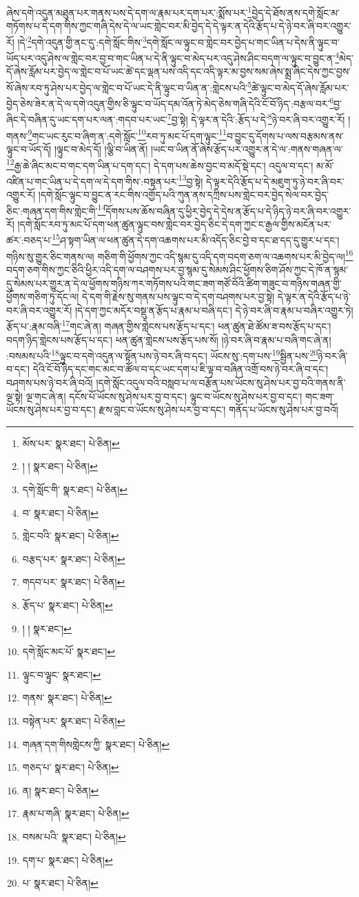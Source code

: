 ཞེས་དགེ་འདུན་མཐུན་པར་གནས་པས་དེ་དག་ལ་རྣམ་པར་དག་པར་:སྨོས་པར་\footnote{མོས་པར་  སྣར་ཐང་།  པེ་ཅིན། }བྱེད་དེ་ཐོས་ནས་དགེ་སློང་མ་གཏོགས་པ་དེ་དག་གིས་ཀྱང་གཞི་དེས་དེ་ལ་ཡང་གླེང་བར་མི་བྱེད་དེ་དེ་ལྟར་ན་དེའི་རྩོད་པ་དེ་ཉེ་བར་ཞི་བར་འགྱུར་རོ། །དེ་\footnote{། །  སྣར་ཐང་།  པེ་ཅིན། }དགེ་འདུན་གྱི་ནང་དུ་:དགེ་སློང་གིས་\footnote{དགེ་སློང་གི་  སྣར་ཐང་།  པེ་ཅིན། }དགེ་སློང་ལ་ལྟུང་བ་གླེང་བར་བྱེད་པ་གང་ཡིན་པ་དེས་ནི་ལྟུང་བ་ཡོད་པར་འདུ་ཤེས་ལ་གླེང་བར་བྱ་བ་གང་ཡིན་པ་དེ་ནི་ལྟུང་བ་མེད་པར་འདུ་ཤེས་ཤིང་བདག་ལ་ལྟུང་བ་བྱུང་ན་\footnote{བ་  སྣར་ཐང་།  པེ་ཅིན། }མེད་དོ་ཞེས་རློམ་པར་བྱེད་ལ་གླེང་བ་པོ་ཡང་ཚེ་དང་ལྡན་པས་འདི་དང་འདི་ལྟར་མ་བྱས་སམ་ཞེས་སྨྲ་ཞིང་དེས་ཀྱང་བྱས་སོ་ཞེས་རབ་ཏུ་ཤེས་པར་བྱེད་ལ་གླེང་བ་པོ་ཡང་དེ་ནི་ལྟུང་བ་ཡིན་ན་:གླེངས་པའི་\footnote{གླེང་བའི་  སྣར་ཐང་།  པེ་ཅིན། }ཚེ་ལྟུང་བ་མེད་དོ་ཞེས་རློམ་པར་བྱེད་ཅེས་ཟེར་ན་དེ་ལ་དགེ་འདུན་གྱིས་ཅི་ལྟུང་བ་ཡོད་དམ་འོན་ཏེ་མེད་ཅེས་གཞི་དེའི་ངོ་བོ་ཉིད་:བརྩལ་བར་\footnote{བརྩད་པར་  སྣར་ཐང་།  པེ་ཅིན། }བྱ་ཞིང་དེ་བཞིན་དུ་ཡང་དག་པར་ལན་:གདབ་པར་ཡང་\footnote{གདབ་པར་  སྣར་ཐང་།  པེ་ཅིན། }བྱ་སྟེ། དེ་ལྟར་ན་དེའི་:རྩོད་པ་དེ་\footnote{རྩོད་པ་  སྣར་ཐང་།  པེ་ཅིན། }ཉེ་བར་ཞི་བར་འགྱུར་རོ། །གནས་\footnote{། །  སྣར་ཐང་། }གང་ཡང་རུང་བ་ཞིག་ན་:དགེ་སློང་\footnote{དགེ་སློང་མང་པོ་  སྣར་ཐང་། }རབ་ཏུ་མང་པོ་དག་ལྟུང་\footnote{ལྟུང་བ་ལྟུང་  སྣར་ཐང་། }བ་བྱུང་དུ་དོགས་པ་ལས་བརྩམས་ནས་ལྟུང་བ་ཡོད་དོ། །ལྟུང་བ་མེད་དོ། །ལྕི་བ་ཡིན་ནོ། །ཡང་བ་ཡིན་ནོ་ཞེས་རྩོད་པར་འགྱུར་ན་དེ་ལ་:གནས་གཞན་ལ་\footnote{གནས་  སྣར་ཐང་།  པེ་ཅིན། }རྒྱ་ཆེ་ཞིང་མང་བ་གང་དག་ཡིན་པ་དག་དང་། དེ་དག་པས་ཆེས་བྱང་བ་མདོ་སྡེ་དང་། འདུལ་བ་དང་། མ་མོ་འཛིན་པ་གང་ཡིན་པ་དེ་དག་ལ་དེ་དག་གིས་:བསྟན་པར་\footnote{བསྟེན་པར་  སྣར་ཐང་།  པེ་ཅིན། }བྱ་སྟེ། དེ་ལྟར་དེའི་རྩོད་པ་དེ་མཇུག་ཏུ་ཉེ་བར་ཞི་བར་འགྱུར་རོ། །དགེ་སློང་ལྟུང་བ་བྱུང་ན་རང་གིས་འགྱོད་པའི་ཀུན་ནས་དཀྲིས་པས་གླེང་བར་བྱེད་སེལ་བར་བྱེད་ཅིང་:གཞན་དག་གིས་གླེང་གི་\footnote{གཞན་དག་གིསགླེངས་ཀྱི་  སྣར་ཐང་།  པེ་ཅིན། }དོགས་པས་ཆོས་བཞིན་དུ་ཕྱིར་བྱེད་དེ་དེས་ན་རྩོད་པ་དེ་ཉིད་ཉེ་བར་ཞི་བར་འགྱུར་རོ། །དགེ་སློང་རབ་ཏུ་མང་པོ་དག་ཕན་ཚུན་ལྟུང་བས་གླེང་བར་བྱེད་ཅིང་དེ་དག་ཀྱང་ང་རྒྱལ་གྱིས་མངོན་པར་ཚར་:བཅད་པ་\footnote{གཅད་པ་  སྣར་ཐང་།  པེ་ཅིན། }ཤ་སྟག་ཡིན་ལ་ཕན་ཚུན་དེ་དག་འཆགས་པར་མི་འདོད་ཅིང་བྱེ་བ་དང་ཐ་དད་དུ་གྱུར་པ་དང་། གཉིས་སུ་གྱུར་ཅིང་གནས་ལ། གཅིག་གི་ཕྱོགས་ཀྱང་འདི་སྙམ་དུ་འདི་དག་བདག་ཅག་ལ་འཆགས་པར་མི་བྱེད་ལ།\footnote{ན།  སྣར་ཐང་།  པེ་ཅིན། } བདག་ཅག་གིས་ཀྱང་ཅིའི་ཕྱིར་འདི་དག་ལ་བཤགས་པར་བྱ་སྙམ་དུ་སེམས་ཤིང་ཕྱོགས་ཅིག་ཤོས་ཀྱང་དེ་ཁོ་ན་སྙམ་དུ་སེམས་པར་གྱུར་ན་དེ་ལ་ཕྱོགས་གཉིས་ཀར་གཏོགས་པའི་གང་ཟག་གཙོ་བོའི་ཚིག་གཟུང་བ་གཉིས་གཞན་གྱི་ཕྱོགས་གཅིག་ཏུ་དོང་ལ། དེ་དག་གི་རྗེས་སུ་གནས་པས་ལྟུང་བ་དེ་དག་བཤགས་པར་བྱ་སྟེ། དེ་ལྟར་ན་དེའི་རྩོད་པ་ཉེ་བར་ཞི་བར་འགྱུར་རོ། །དེ་དག་ཀྱང་མདོར་བསྡུ་ན་རྩོད་པ་རྣམ་པ་བཞི་དང་། དེ་ཉེ་བར་ཞི་བ་རྣམ་པ་བཞིར་འགྱུར་ཏེ། རྩོད་པ་:རྣམ་བཞི་\footnote{རྣམ་པ་གཞི་  སྣར་ཐང་།  པེ་ཅིན། }གང་ཞེ་ན། གཞན་གྱིས་གླེངས་པས་རྩོད་པ་དང་། ཕན་ཚུན་ཐེ་ཚོམ་ཟ་བས་རྩོད་པ་དང་། བདག་ཉིད་གླེངས་པས་རྩོད་པ་དང་། ཕན་ཚུན་གླེངས་པས་རྩོད་པས་སོ། །ཉེ་བར་ཞི་བ་རྣམ་པ་བཞི་གང་ཞེ་ན། :བསམས་པའི་\footnote{བསམ་པའི་  སྣར་ཐང་།  པེ་ཅིན། }ལྟུང་བ་དགེ་འདུན་ལ་སྟོན་པས་ཉེ་བར་ཞི་བ་དང་། ཡོངས་སུ་:དག་པས་\footnote{དག་པ་  སྣར་ཐང་།  པེ་ཅིན། }སྦྱིན་པས་\footnote{པ་  སྣར་ཐང་།  པེ་ཅིན། }ཉེ་བར་ཞི་བ་དང་། དེའི་ངོ་བོ་ཉིད་དང་གང་མང་བ་ཚོལ་བ་དང་ཡང་དག་པ་ཇི་ལྟ་བ་བཞིན་འགྲོ་བས་ཉེ་བར་ཞི་བ་དང་། བཤགས་པས་ཉེ་བར་ཞི་བའོ། །དགེ་སློང་འདུལ་བའི་བསླབ་པ་ལ་བརྩོན་པས་ཡོངས་སུ་ཤེས་པར་བྱ་བའི་གནས་ནི་ལྔ་སྟེ། ལྔ་གང་ཞེ་ན། དངོས་པོ་ཡོངས་སུ་ཤེས་པར་བྱ་བ་དང་། ལྟུང་བ་ཡོངས་སུ་ཤེས་པར་བྱ་བ་དང་། གང་ཟག་ཡོངས་སུ་ཤེས་པར་བྱ་བ་དང་། རྫས་བླང་བ་ཡོངས་སུ་ཤེས་པར་བྱ་བ་དང་། གནོད་པ་ཡོངས་སུ་ཤེས་པར་བྱ་བའོ། 